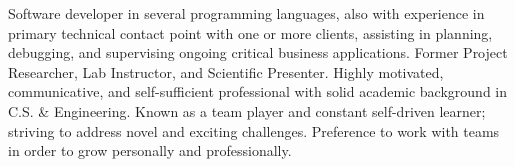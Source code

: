 

\begin{cvsummary}

Software developer in several programming languages, also with experience in primary technical contact point with one or more clients, assisting in planning, debugging, and supervising ongoing critical business applications. 
Former Project Researcher, Lab Instructor, and Scientific Presenter. %
Highly motivated, communicative, and self-sufficient %
professional with solid academic background in C.S. \& Engineering.%
Known as a team player %
and constant self-driven learner; 
striving to address novel and exciting challenges. %
Preference to work with %
teams in order to grow personally and professionally.
\end{cvsummary}
